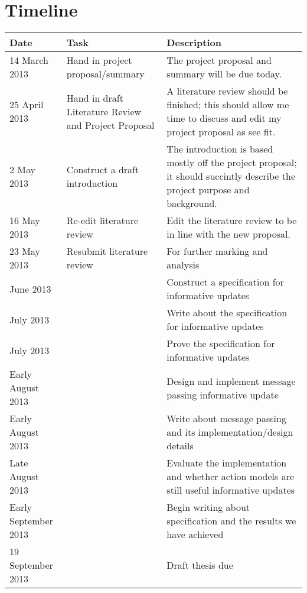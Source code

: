 \documentclass[12pt, a4paper]{article}
\begin{document}
\section*{Timeline}

\begin{center}
	\begin{tabular}{ | l | p{5cm} | p{5cm} |}
		\hline
		Date & Task & Description \\
		\hline
		14 March 2013 & Hand in project proposal/summary & The project proposal and summary will be due today.\\
		\hline
		25 April 2013 & Hand in draft Literature Review and Project Proposal & A literature review should be finished; this should allow me time to discuss and edit my project proposal as see fit.\\
		\hline
		2 May 2013 & Construct a draft introduction & The introduction is based mostly off the project proposal; it should succintly describe the project purpose and background.\\
		\hline
		16 May 2013 & Re-edit literature review & Edit the literature review to be in line with the new proposal.\\
		\hline
		23 May 2013 & Resubmit literature review & For further marking and analysis\\
		\hline
		June 2013 & & Construct a specification for informative updates \\
		\hline
		July 2013 & & Write about the specification for informative updates \\
		\hline
		July 2013 & & Prove the specification for informative updates \\
		\hline
		Early August 2013 & & Design and implement message passing informative update \\
		\hline
		Early August 2013 & & Write about message passing and its implementation/design details \\
		\hline
		Late August 2013 & & Evaluate the implementation and whether action models are still useful informative updates\\
		\hline
		Early September 2013 & & Begin writing about specification and the results we have achieved \\
		\hline
		19 September 2013 & & Draft thesis due \\
		\hline
	\end{tabular}
\end{center}


\end{document}
